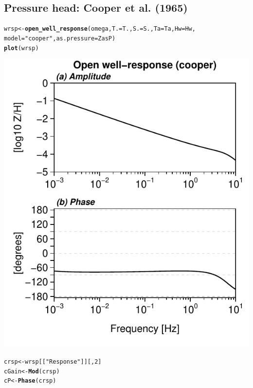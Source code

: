 \documentclass[12pt]{article}\usepackage[]{graphicx}\usepackage[]{color}
\makeatletter
\def\maxwidth{ %
  \ifdim\Gin@nat@width>\linewidth
    \linewidth
  \else
    \Gin@nat@width
  \fi
}
\newcommand{\hlnum}[1]{\textcolor[rgb]{0.686,0.059,0.569}{#1}}%
\newcommand{\hlstr}[1]{\textcolor[rgb]{0.192,0.494,0.8}{#1}}%
\newcommand{\hlstd}[1]{\textcolor[rgb]{0.345,0.345,0.345}{#1}}%
\newcommand{\hlkwb}[1]{\textcolor[rgb]{0.69,0.353,0.396}{#1}}%
\newcommand{\hlkwc}[1]{\textcolor[rgb]{0.333,0.667,0.333}{#1}}%
\newcommand{\hlkwd}[1]{\textcolor[rgb]{0.737,0.353,0.396}{\textbf{#1}}}%
\newenvironment{kframe}{%
 \def\at@end@of@kframe{}%
 \ifinner\ifhmode%
  \def\at@end@of@kframe{\end{minipage}}%
  \begin{minipage}{\columnwidth}%
 \fi\fi%
 \def\FrameCommand##1{\hskip\@totalleftmargin \hskip-\fboxsep
 \colorbox{shadecolor}{##1}\hskip-\fboxsep
     \hskip-\linewidth \hskip-\@totalleftmargin \hskip\columnwidth}%
 \MakeFramed {\advance\hsize-\width
   \@totalleftmargin\z@ \linewidth\hsize
   \@setminipage}}%
 {\par\unskip\endMakeFramed%
 \at@end@of@kframe}
\newenvironment{knitrout}{}{} %
\makeatother
\begin{document}
\subsection{Pressure head: Cooper et al. (1965)}

\begin{knitrout}\small
{}\color{fgcolor}\begin{kframe}
\begin{alltt}
\hlstd{wrsp} \hlkwb{<-} \hlkwd{open_well_response}\hlstd{(omega,} \hlkwc{T.} \hlstd{= T.,} \hlkwc{S.} \hlstd{= S.,} \hlkwc{Ta} \hlstd{= Ta,} \hlkwc{Hw} \hlstd{= Hw,}
    \hlkwc{model} \hlstd{=} \hlstr{"cooper"}\hlstd{,} \hlkwc{as.pressure} \hlstd{= ZasP)}
\hlkwd{plot}\hlstd{(wrsp)}
\end{alltt}
\end{kframe}
\includegraphics[width=\maxwidth]{figure/COOPERRESP-1} 
\begin{kframe}\begin{alltt}
\hlstd{crsp} \hlkwb{<-} \hlstd{wrsp[[}\hlstr{"Response"}\hlstd{]][,} \hlnum{2}\hlstd{]}
\hlstd{cGain} \hlkwb{<-} \hlkwd{Mod}\hlstd{(crsp)}
\hlstd{cP} \hlkwb{<-} \hlkwd{Phase}\hlstd{(crsp)}
\end{alltt}
\end{kframe}
\end{knitrout}
\end{document}
